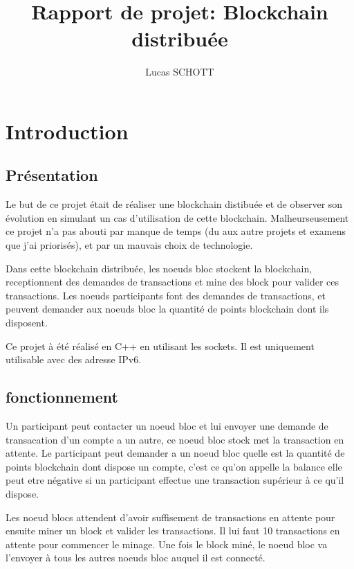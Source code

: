 \documentclass[a4paper,11pt,DIV=12]{scrreprt}
\title{Rapport de projet: Blockchain distribuée}
\author{Lucas SCHOTT}
\begin{document}

    \maketitle

    \chapter{Introduction}

    \section{Présentation}

    Le but de ce projet était de réaliser une blockchain distibuée et de
    observer son évolution en simulant un cas d'utilisation de cette
    blockchain. Malheurseusement ce projet n'a pas abouti par manque de temps
    (du aux autre projets et examens que j'ai priorisés), et par un mauvais
    choix de technologie.

    Dans cette blockchain distribuée, les noeuds bloc stockent la blockchain,
    receptionnent des demandes de transactions et mine des block pour valider
    ces transactions.
    Les noeuds participants font des demandes de transactions, et peuvent
    demander aux noeuds bloc la quantité de points blockchain dont ils disposent.

    Ce projet à été réalisé en C++ en utilisant les sockets. Il est uniquement
    utilisable avec des adresse IPv6.
    \\

    \section{fonctionnement}

    Un participant peut contacter un noeud bloc et lui envoyer une demande de
    transacation d'un compte a un autre, ce noeud bloc stock met la transaction
    en attente. Le participant peut demander a un noeud bloc quelle est la
    quantité de points blockchain dont dispose un compte, c'est ce qu'on
    appelle la balance elle peut etre négative si un participant effectue une
    transaction supérieur à ce qu'il dispose.

    Les noeud blocs attendent d'avoir suffisement de transactions en attente
    pour ensuite miner un block et valider les transactions. Il lui faut 10
    transactions en attente pour commencer le minage. Une fois le block
    miné, le noeud bloc va l'envoyer à tous les autres noeuds bloc auquel il
    est connecté.
    \\
\end{document}
